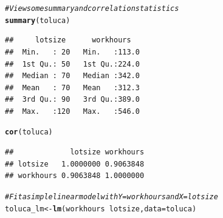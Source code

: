 \documentclass{article}\usepackage[]{graphicx}\usepackage[]{color}
\makeatletter
\newcommand{\hlcom}[1]{\textcolor[rgb]{0.678,0.584,0.686}{\textit{#1}}}%
\newcommand{\hlopt}[1]{\textcolor[rgb]{0,0,0}{#1}}%
\newcommand{\hlstd}[1]{\textcolor[rgb]{0.345,0.345,0.345}{#1}}%
\newcommand{\hlkwb}[1]{\textcolor[rgb]{0.69,0.353,0.396}{#1}}%
\newcommand{\hlkwc}[1]{\textcolor[rgb]{0.333,0.667,0.333}{#1}}%
\newcommand{\hlkwd}[1]{\textcolor[rgb]{0.737,0.353,0.396}{\textbf{#1}}}%
\newenvironment{kframe}{%
 \def\at@end@of@kframe{}%
 \ifinner\ifhmode%
  \def\at@end@of@kframe{\end{minipage}}%
  \begin{minipage}{\columnwidth}%
 \fi\fi%
 \def\FrameCommand##1{\hskip\@totalleftmargin \hskip-\fboxsep
 \colorbox{shadecolor}{##1}\hskip-\fboxsep
     \hskip-\linewidth \hskip-\@totalleftmargin \hskip\columnwidth}%
 \MakeFramed {\advance\hsize-\width
   \@totalleftmargin\z@ \linewidth\hsize
   \@setminipage}}%
 {\par\unskip\endMakeFramed%
 \at@end@of@kframe}
\newenvironment{knitrout}{}{} %
\makeatother
\begin{document}
\begin{knitrout}
\begin{kframe}\begin{alltt}
\hlcom{# View some summary and correlation statistics}
\hlkwd{summary}\hlstd{(toluca)}
\end{alltt}
\begin{verbatim}
##     lotsize      workhours    
##  Min.   : 20   Min.   :113.0  
##  1st Qu.: 50   1st Qu.:224.0  
##  Median : 70   Median :342.0  
##  Mean   : 70   Mean   :312.3  
##  3rd Qu.: 90   3rd Qu.:389.0  
##  Max.   :120   Max.   :546.0
\end{verbatim}
\begin{alltt}
\hlkwd{cor}\hlstd{(toluca)}
\end{alltt}
\begin{verbatim}
##             lotsize workhours
## lotsize   1.0000000 0.9063848
## workhours 0.9063848 1.0000000
\end{verbatim}
\begin{alltt}
\hlcom{# Fit a simple linear model with Y = workhours and X = lotsize}
\hlstd{toluca_lm} \hlkwb{<-} \hlkwd{lm}\hlstd{(workhours} \hlopt{~} \hlstd{lotsize,} \hlkwc{data} \hlstd{= toluca)}


\end{alltt}
\end{kframe}
\end{knitrout}
\end{document}
